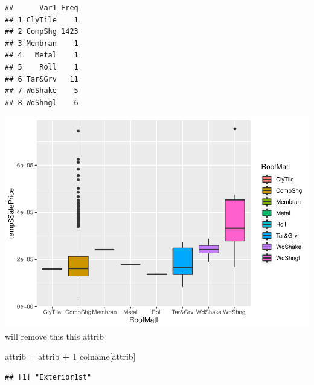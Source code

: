 \documentclass[]{article}
\newenvironment{Shaded}{\begin{snugshade}}{\end{snugshade}}
\newcommand{\DecValTok}[1]{\textcolor[rgb]{0.00,0.00,0.81}{#1}}
\newcommand{\StringTok}[1]{\textcolor[rgb]{0.31,0.60,0.02}{#1}}
\newcommand{\OperatorTok}[1]{\textcolor[rgb]{0.81,0.36,0.00}{\textbf{#1}}}
\newcommand{\NormalTok}[1]{#1}
\begin{document}
\begin{verbatim}
##      Var1 Freq
## 1 ClyTile    1
## 2 CompShg 1423
## 3 Membran    1
## 4   Metal    1
## 5    Roll    1
## 6 Tar&Grv   11
## 7 WdShake    5
## 8 WdShngl    6
\end{verbatim}

\includegraphics{EDA_files/figure-latex/unnamed-chunk-45-1.pdf} will
remove this this attrib

\begin{Shaded}
\begin{Highlighting}[]
\NormalTok{attrib =}\StringTok{ }\NormalTok{attrib }\OperatorTok{+}\StringTok{ }\DecValTok{1}
\NormalTok{colname[attrib]}
\end{Highlighting}
\end{Shaded}

\begin{verbatim}
## [1] "Exterior1st"
\end{verbatim}
\end{document}
